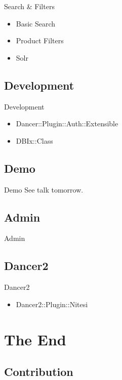 \begin{frame}{Search \&  Filters}
\begin{itemize}
\item Basic Search
\item Product Filters
\item Solr
\end{itemize}
\end{frame}

\subsection{Development}
\begin{frame}{Development}
\begin{itemize}
\item Dancer::Plugin::Auth::Extensible
\item DBIx::Class
\end{itemize}
\end{frame}

\subsection{Demo}
\begin{frame}{Demo}
See talk tomorrow.
\end{frame}

\subsection{Admin}
\begin{frame}{Admin}

\end{frame}

\subsection{Dancer2}
\begin{frame}{Dancer2}
\begin{itemize}
\item Dancer2::Plugin::Nitesi
\end{itemize}
\end{frame}

\section{The End}

\subsection{Contribution}
